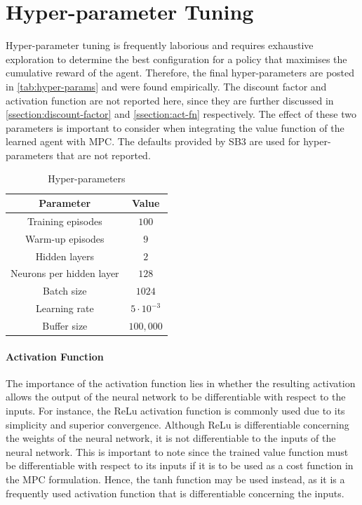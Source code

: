 \section{Hyper-parameter Tuning}
Hyper-parameter tuning is frequently laborious and requires exhaustive exploration to determine the best configuration for a policy that maximises the cumulative reward of the agent. Therefore, the final hyper-parameters are posted in \autoref{tab:hyper-params} and were found empirically. The discount factor and activation function are not reported here, since they are further discussed in \autoref{ssection:discount-factor} and \autoref{ssection:act-fn} respectively. The effect of these two parameters is important to consider when integrating the value function of the learned agent with MPC. The defaults provided by SB3 are used for hyper-parameters that are not reported.

\begin{table}[H]
	\centering
	\renewcommand{\arraystretch}{1.3} %
	\begin{tabular}{|c|c|}
		\hline
		\textbf{Parameter} & \textbf{Value} \\
		\hline
		Training episodes & $100$  \\
		Warm-up episodes &  $9$\\
		Hidden layers & $2$ \\
		Neurons per hidden layer & $128$ \\
		Batch size & $1024$ \\
		Learning rate & $5 \cdot 10^{-3}$ \\
		Buffer size & $100,000$ \\
		\hline
	\end{tabular}
	\caption{Hyper-parameters}
	\label{tab:hyper-params}
\end{table}


\paragraph{Activation Function} 
The importance of the activation function lies in whether the resulting activation allows the output of the neural network to be differentiable with respect to the inputs. For instance, the ReLu activation function is commonly used due to its simplicity and superior convergence. Although ReLu is differentiable concerning the weights of the neural network, it is not differentiable to the inputs of the neural network. This is important to note since the trained value function must be differentiable with respect to its inputs if it is to be used as a cost function in the MPC formulation. Hence, the tanh function may be used instead, as it is a frequently used activation function that is differentiable concerning the inputs.

